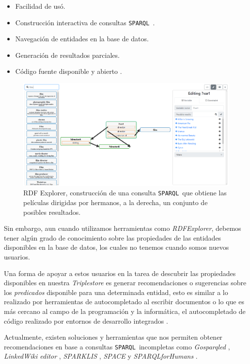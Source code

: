\documentclass[conference,compsoc]{IEEEtran}
\newcommand{\spql}{\texttt{SPARQL}\ }
\begin{document}
\begin{itemize}
    \item Facilidad de usó.
    \item Construcción interactiva de consultas \spql.
    \item Navegación de entidades en la base de datos.
    \item Generación de resultados parciales.
    \item Código fuente disponible y abierto \cite{vargas2019rdfrepo}.
\end{itemize}

\begin{figure}
    \centering
    \includegraphics[width=\linewidth]{rdfexplorer.png}
    \caption{RDF Explorer, construcción de una consulta \spql que obtiene las películas dirigidas
    por hermanos, a la derecha, un conjunto de posibles resultados.}
    \label{fig:rdfexplorer}
\end{figure}

Sin embargo, aun cuando utilizamos herramientas como \textit{RDFExplorer}, debemos tener
algún grado de conocimiento sobre las propiedades de las entidades disponibles
en la base de datos, los cuales no tenemos cuando somos nuevos usuarios.

Una forma de apoyar a estos usuarios en la tarea de descubrir las propiedades disponibles
en nuestra \textit{Triplestore} es generar recomendaciones o sugerencias sobre los \textit{predicados}
disponible para una determinada entidad, esto es similar a lo realizado por herramientas de autocompletado
al escribir documentos o lo que es más cercano al campo de la programación y la informática, el
autocompletado de código realizado por entornos de desarrollo integrados \cite{bruch2009learning}.

Actualmente, existen soluciones y herramientas que nos permiten obtener recomendaciones en base a 
consultas \spql incompletas como \textit{Gosparqled} \cite{campinas2014live}, \textit{LinkedWiki editor}
\cite{rafes2018designing}, \textit{SPARKLIS} \cite{ferre2017sparklis}, \textit{SPACE} \cite{kramer2013space}
y \textit{SPARQLforHumans} \cite{parra2020autocompletion}.
\end{document}
